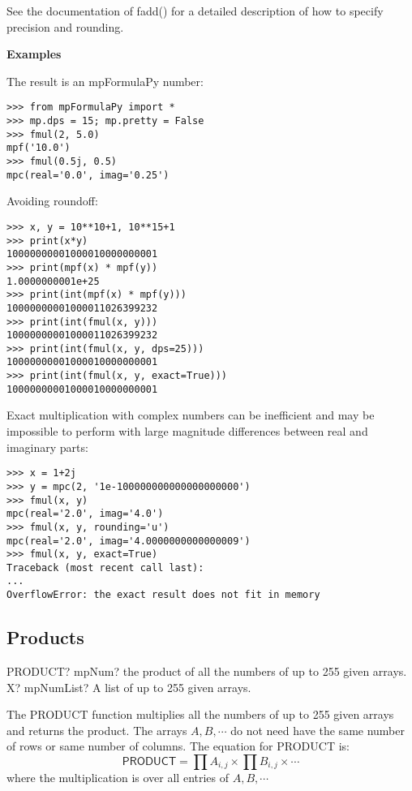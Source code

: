 \vpara
See the documentation of fadd() for a detailed description of how to specify precision and rounding.

\vpara
\textbf{Examples}


The result is an mpFormulaPy number:

\begin{lstlisting}
>>> from mpFormulaPy import *
>>> mp.dps = 15; mp.pretty = False
>>> fmul(2, 5.0)
mpf('10.0')
>>> fmul(0.5j, 0.5)
mpc(real='0.0', imag='0.25')
\end{lstlisting}


Avoiding roundoff:

\begin{lstlisting}
>>> x, y = 10**10+1, 10**15+1
>>> print(x*y)
10000000001000010000000001
>>> print(mpf(x) * mpf(y))
1.0000000001e+25
>>> print(int(mpf(x) * mpf(y)))
10000000001000011026399232
>>> print(int(fmul(x, y)))
10000000001000011026399232
>>> print(int(fmul(x, y, dps=25)))
10000000001000010000000001
>>> print(int(fmul(x, y, exact=True)))
10000000001000010000000001
\end{lstlisting}


Exact multiplication with complex numbers can be inefficient and may be impossible to perform with large magnitude differences between real and imaginary parts:

\begin{lstlisting}
>>> x = 1+2j
>>> y = mpc(2, '1e-100000000000000000000')
>>> fmul(x, y)
mpc(real='2.0', imag='4.0')
>>> fmul(x, y, rounding='u')
mpc(real='2.0', imag='4.0000000000000009')
>>> fmul(x, y, exact=True)
Traceback (most recent call last):
...
OverflowError: the exact result does not fit in memory
\end{lstlisting}




\subsection{Products}

\begin{mpFunctionsExtract}
	\mpWorksheetFunctionOneNotImplemented
	{PRODUCT? mpNum? the product of all the numbers of up to 255 given arrays.}
	{X? mpNumList? A list of up to 255 given arrays.}
\end{mpFunctionsExtract}

\vspace{0.3cm}
The \textsf{PRODUCT} function multiplies all the numbers of  up to 255 given arrays and returns the product. The arrays $A, B, \cdots$ do not need have the same number of rows or same number of columns.
The equation for \textsf{PRODUCT} is:
\begin{equation}
	\textsf{PRODUCT} = \prod A_{i,j} \times \prod B_{i,j} \times \cdots
\end{equation}
where the multiplication is over all entries of $A, B, \cdots$ 





